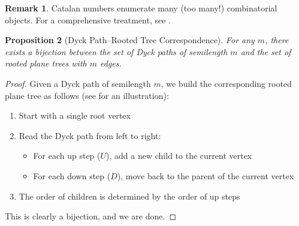 \documentclass[letterpaper,11pt,oneside,reqno]{article}
\numberwithin{equation}{section}
\newtheorem{proposition}{Proposition}[section]
\theoremstyle{definition}
\newtheorem{remark}[proposition]{Remark}
\begin{document}
\begin{remark}
	\label{rmk:stanley-catalans}
	Catalan numbers enumerate many (too many!) combinatorial objects. For a comprehensive treatment, see \cite{stanley2015catalan}.
\end{remark}

\begin{proposition}[Dyck Path--Rooted Tree Correspondence]
	\label{prop:dyck-tree}
For any $m$, there exists a bijection between
the set of Dyck paths of semilength $m$ and the set of rooted plane trees with $m$ edges.
\end{proposition}

\begin{proof}
Given a Dyck path of semilength $m$, we build the corresponding rooted plane tree as follows
(see  for an illustration):
\begin{enumerate}
    \item Start with a single root vertex
    \item Read the Dyck path from left to right:
        \begin{itemize}
            \item For each up step ($U$), add a new child to the current vertex
            \item For each down step ($D$), move back to the parent of the current vertex
        \end{itemize}
    \item The order of children is determined by the order of up steps
\end{enumerate}
This is clearly a bijection, and we are done.
\end{proof}
\end{document}
